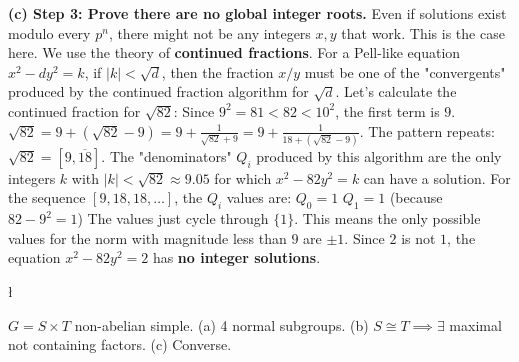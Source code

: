 \begin{solution}
\textbf{(c) Step 3: Prove there are no global integer roots.}
Even if solutions exist modulo every $p^n$, there might not be any integers $x, y$ that work. This is the case here.
We use the theory of \textbf{continued fractions}. For a Pell-like equation $x^2 - dy^2 = k$, if $|k| < \sqrt{d}$, then the fraction $x/y$ must be one of the "convergents" produced by the continued fraction algorithm for $\sqrt{d}$.
Let's calculate the continued fraction for $\sqrt{82}$:
Since $9^2 = 81 < 82 < 10^2$, the first term is $9$.
$\sqrt{82} = 9 + (\sqrt{82}-9) = 9 + \frac{1}{\sqrt{82}+9} = 9 + \frac{1}{18 + (\sqrt{82}-9)}$.
The pattern repeats: $\sqrt{82} = [9, \overline{18}]$.
The "denominators" $Q_i$ produced by this algorithm are the only integers $k$ with $|k| < \sqrt{82} \approx 9.05$ for which $x^2 - 82y^2 = k$ can have a solution.
For the sequence $[9, 18, 18, \dots]$, the $Q_i$ values are:
$Q_0 = 1$
$Q_1 = 1$ (because $82 - 9^2 = 1$)
The values just cycle through $\{1\}$. This means the only possible values for the norm with magnitude less than $9$ are $\pm 1$.
Since $2$ is not $1$, the equation $x^2 - 82y^2 = 2$ has \textbf{no integer solutions}.
\end{solution}

\begin{exercise}
\l\label{2014:4}

\label{algebra:2014:4}$G = S \times T$ non-abelian simple.
(a) 4 normal subgroups. (b) $S \cong T \implies \exists$ maximal not containing factors. (c) Converse.
\end{exercise}


